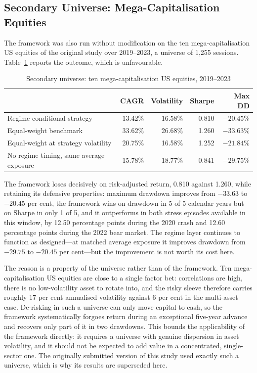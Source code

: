 \documentclass{singlecol-new}
\theoremstyle{TH}{
\newtheorem{lemma}{Lemma}
\newtheorem{theorem}[lemma]{Theorem}
\newtheorem{corrolary}[lemma]{Corrolary}
\newtheorem{conjecture}[lemma]{Conjecture}
\newtheorem{proposition}[lemma]{Proposition}
\newtheorem{claim}[lemma]{Claim}
\newtheorem{stheorem}[lemma]{Wrong Theorem}
\newtheorem{algorithm}{Algorithm}
}
\theoremstyle{THrm}{
\newtheorem{definition}{Definition}[section]
\newtheorem{question}{Question}[section]
\newtheorem{remark}{Remark}
\newtheorem{scheme}{Scheme}
}
\theoremstyle{THhit}{
\newtheorem{case}{Case}[section]
}
\begin{document}
\subsection{Secondary Universe: Mega-Capitalisation Equities}
\label{sec:megacap}

The framework was also run without modification on the ten mega-capitalisation US
equities of the original study over 2019--2023, a universe of 1{,}255 sessions.
Table~\ref{tab:megacap} reports the outcome, which is unfavourable.

\begin{table}[!ht]
\centering
\caption{Secondary universe: ten mega-capitalisation US equities, 2019--2023}
\label{tab:megacap}
\small
\begin{tabular}{p{4.8cm}rrrr}
\hline
& \textbf{CAGR} & \textbf{Volatility} & \textbf{Sharpe} & \textbf{Max DD} \\
\hline
Regime-conditional strategy & 13.42\% & 16.58\% & 0.810 & $-20.45$\% \\
Equal-weight benchmark & 33.62\% & 26.68\% & 1.260 & $-33.63$\% \\
Equal-weight at strategy volatility & 20.75\% & 16.58\% & 1.252 & $-21.84$\% \\
No regime timing, same average exposure & 15.78\% & 18.77\% & 0.841 & $-29.75$\% \\
\hline
\end{tabular}
\end{table}

The framework loses decisively on risk-adjusted return, 0.810 against 1.260, while
retaining its defensive properties: maximum drawdown improves from $-33.63$ to $-20.45$
per cent, the framework wins on drawdown in 5 of 5 calendar years but on Sharpe in only
1 of 5, and it outperforms in both stress episodes available in this window, by 12.50
percentage points during the 2020 crash and 12.60 percentage points during the 2022
bear market.
The regime layer continues to function as designed---at matched average exposure it
improves drawdown from $-29.75$ to $-20.45$ per cent---but the improvement is not worth
its cost here.

The reason is a property of the universe rather than of the framework. Ten
mega-capitalisation US equities are close to a single factor bet: correlations are high,
there is no low-volatility asset to rotate into, and the risky sleeve therefore carries
roughly 17 per cent annualised volatility against 6 per cent in the multi-asset case.
De-risking in such a universe can only move capital to cash, so the framework
systematically forgoes return during an exceptional five-year advance and recovers only
part of it in two drawdowns. This bounds the applicability of the framework directly: it
requires a universe with genuine dispersion in asset volatility, and it should not be
expected to add value in a concentrated, single-sector one. The
originally submitted version of this study used exactly such a universe, which is why
its results are superseded here.
\end{document}
